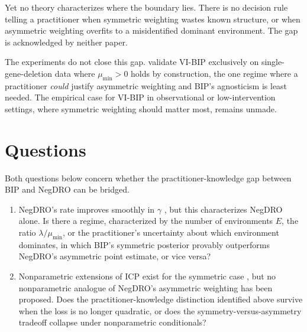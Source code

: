 \documentclass[10.5pt]{article}
\begin{document}
Yet no theory characterizes where the boundary lies. There is no decision rule telling a practitioner when symmetric weighting wastes known structure, or when asymmetric weighting overfits to a misidentified dominant environment. The gap is acknowledged by neither paper.

The experiments do not close this gap. \citet[Sec.~5]{wu2025bayesian} validate VI-BIP exclusively on single-gene-deletion data where $\mu_{\min}>0$ holds by construction, the one regime where a practitioner \emph{could} justify asymmetric weighting and BIP's agnosticism is least needed. The empirical case for VI-BIP in observational or low-intervention settings, where symmetric weighting should matter most, remains unmade.

\section*{Questions}
Both questions below concern whether the practitioner-knowledge gap between BIP and NegDRO can be bridged.
\begin{enumerate}\setlength\itemsep{1pt}
  \item NegDRO's rate improves smoothly in $\gamma$ \citep[Prop.~2]{wang2026negdro}, but this characterizes NegDRO alone. Is there a regime, characterized by the number of environments $E$, the ratio $\lambda/\mu_{\min}$, or the practitioner's uncertainty about which environment dominates, in which BIP's symmetric posterior provably outperforms NegDRO's asymmetric point estimate, or vice versa?
  \item Nonparametric extensions of ICP exist for the symmetric case \citep{heinzedeml2018nonparametric}, but no nonparametric analogue of NegDRO's asymmetric weighting has been proposed. Does the practitioner-knowledge distinction identified above survive when the loss is no longer quadratic, or does the symmetry-versus-asymmetry tradeoff collapse under nonparametric conditionals?
\end{enumerate}

\vspace{-0.2em}
{\scriptsize\setlength{\bibsep}{0pt}


}
\end{document}
